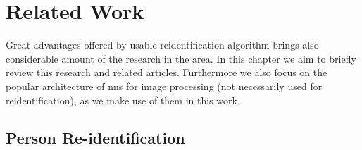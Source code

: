 \chapter{Related Work}

Great advantages offered by usable reidentification algorithm brings also considerable
amount of the research in the area. In this chapter we aim to briefly review this
research and related articles. Furthermore we also focus on the popular architecture
of \glspl{nn} for image processing (not necessarily used for reidentification), as
we make use of them in this work.

\section{Person Re-identification}

